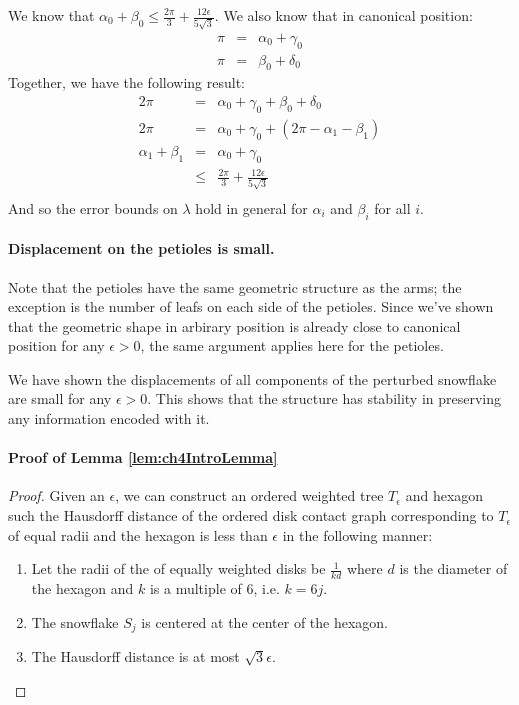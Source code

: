 \documentclass[10pt]{CSUNthesis}
\theoremstyle{plain}%
\theoremstyle{definition}
\theoremstyle{remark}
\newcommand{\lr}[1]{\left( #1 \right)}
\begin{document}
We know that $\alpha_0 + \beta_0 \leq \frac{2\pi}{3} + \frac{12\epsilon}{5\sqrt{3}}.$
We also know that in canonical position:
$$ 
\begin{array}{rcl}
\pi &=& \alpha_0 + \gamma_0 \\
\pi &=& \beta_0 + \delta_0
\end{array}
$$
Together, we have the following result:
\begin{eqnarray*}
2\pi &=& \alpha_0 + \gamma_0 + \beta_0 + \delta_0\\
2\pi &=& \alpha_0 + \gamma_0 + \lr{2\pi - \alpha_1 - \beta_1}\\
\alpha_1 + \beta_1&=&\alpha_0 + \gamma_0 \\
&\leq& \frac{2\pi}{3} + \frac{12\epsilon}{5\sqrt{3}}\\
\end{eqnarray*}
And so the error bounds on $\lambda$ hold in general for $\alpha_i$ and $\beta_i$ for all $i$.  
\paragraph{Displacement on the petioles is small.}
Note that the petioles have the same geometric structure as the arms; the exception is the number of leafs on each side of the petioles. 
Since we've shown that the geometric shape in arbirary position is already close to canonical position for any $\epsilon>0$, the same argument applies here for the petioles.

We have shown the displacements of all components of the perturbed snowflake are small for any $\epsilon > 0$.  
This shows that the structure has stability in preserving any information encoded with it.










\paragraph{Proof of Lemma \ref{lem:ch4IntroLemma}}
\begin{proof}
Given an $\epsilon$, we can construct an ordered weighted tree $T_\epsilon$ and hexagon such the Hausdorff distance of the ordered disk contact graph corresponding to $T_\epsilon$ of equal radii and the hexagon is less than $\epsilon$ in the following manner:
\begin{enumerate}
	\item Let the radii of the of equally weighted disks be $\frac{1}{kd}$ where $d$ is the diameter of the hexagon and $k$ is a multiple of 6, i.e. $k = 6 j$.  
	\item The snowflake $S_j$ is centered at the center of the hexagon.
	\item The Hausdorff distance is at most $\sqrt{3}\epsilon$.
\end{enumerate}	
\end{proof}
\end{document}
